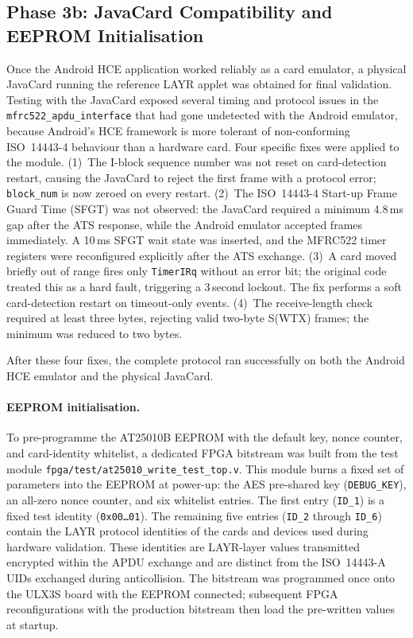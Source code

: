 \documentclass[manuscript,screen,nonacm]{acmart}
\begin{document}
\subsection{Phase 3b: JavaCard Compatibility and EEPROM Initialisation}
\label{sec:process:phase3b}

Once the Android HCE application worked reliably as a card emulator,
a physical JavaCard running the reference LAYR applet was obtained for
final validation.
Testing with the JavaCard exposed several timing and protocol issues
in the \texttt{mfrc522\_apdu\_interface} that had gone undetected with
the Android emulator, because Android's HCE framework is more tolerant
of non-conforming ISO~14443-4 behaviour than a hardware card.
Four specific fixes were applied to the module.
(1)~The I-block sequence number was not reset on card-detection restart,
causing the JavaCard to reject the first frame with a protocol error;
\texttt{block\_num} is now zeroed on every restart.
(2)~The ISO~14443-4 Start-up Frame Guard Time (SFGT) was not observed:
the JavaCard required a minimum 4.8\,ms gap after the ATS response,
while the Android emulator accepted frames immediately.
A 10\,ms SFGT wait state was inserted, and the MFRC522 timer registers
were reconfigured explicitly after the ATS exchange.
(3)~A card moved briefly out of range fires only \texttt{TimerIRq}
without an error bit; the original code treated this as a hard fault,
triggering a 3\,second lockout.
The fix performs a soft card-detection restart on timeout-only events.
(4)~The receive-length check required at least three bytes, rejecting
valid two-byte S(WTX) frames; the minimum was reduced to two bytes.

After these four fixes, the complete protocol ran successfully on both
the Android HCE emulator and the physical JavaCard.

\paragraph{EEPROM initialisation.}
To pre-programme the AT25010B EEPROM with the default key, nonce
counter, and card-identity whitelist, a dedicated FPGA bitstream was
built from the test module
\texttt{fpga/test/at25010\_write\_test\_top.v}.
This module burns a fixed set of parameters into the EEPROM at
power-up: the AES pre-shared key (\texttt{DEBUG\_KEY}),
an all-zero nonce counter, and six whitelist entries.
The first entry (\texttt{ID\_1}) is a fixed test identity
(\texttt{0x00\ldots01}).
The remaining five entries (\texttt{ID\_2} through \texttt{ID\_6})
contain the LAYR protocol identities of the cards and devices used
during hardware validation.
These identities are LAYR-layer values transmitted encrypted within
the APDU exchange and are distinct from the ISO~14443-A UIDs
exchanged during anticollision.
The bitstream was programmed once onto the ULX3S board with the
EEPROM connected; subsequent FPGA reconfigurations with the
production bitstream then load the pre-written values at startup.
\end{document}

